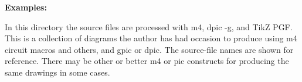 \documentclass[11pt]{article}
\begin{document}
  \hfill
  {\large\bf Examples:
    
    }
  \hfill\break

  In this directory the source files are processed with m4, dpic -g,
  and TikZ PGF.
  This is a collection of diagrams the author has had occasion to
  produce using m4 circuit macros and others, and gpic or dpic.  The
  source-file names are shown for reference.  There may be other or
  better m4 or pic constructs for producing the same drawings in some
  cases.


\end{document}
